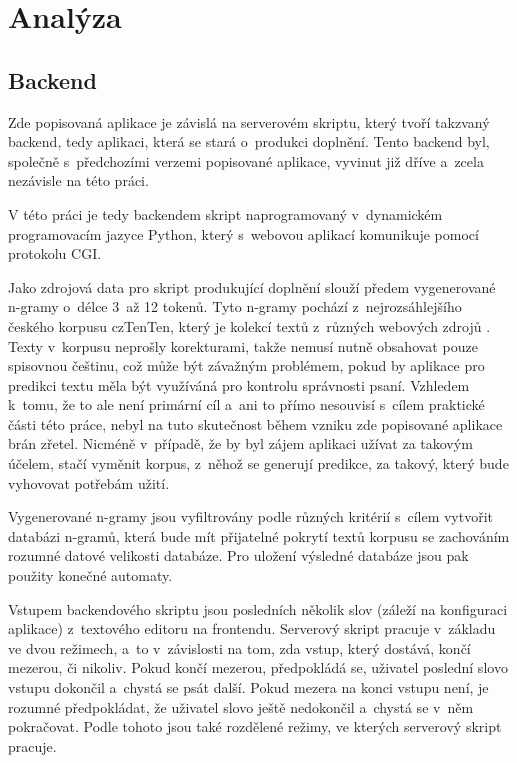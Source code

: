 \documentclass[a4paper,11pt,openany]{book} %
\begin{document}
\chapter{Analýza}

\section{Backend}

Zde popisovaná aplikace je závislá na serverovém skriptu, který tvoří takzvaný backend, tedy aplikaci, která se stará o~produkci doplnění. Tento backend byl, společně s~předchozími verzemi popisované aplikace, vyvinut již dříve a~zcela nezávisle na této práci. \parencite{neverilovaulipova2014}

V této práci je tedy backendem skript naprogramovaný v~dynamickém programovacím jazyce Python, který s~webovou aplikací komunikuje pomocí protokolu CGI. 

Jako zdrojová data pro skript produkující doplnění slouží předem vygenerované n-gramy o~délce 3~až 12 tokenů. Tyto n-gramy pochází z~nejrozsáhlejšího českého korpusu czTenTen, který je kolekcí textů z~různých webových zdrojů \parencite{czTenTen12_info}. Texty v~korpusu neprošly korekturami, takže nemusí nutně obsahovat pouze spisovnou češtinu, což může být závažným problémem, pokud by aplikace pro predikci textu měla být využíváná pro kontrolu správnosti psaní. Vzhledem k~tomu, že to ale není primární cíl a~ani to přímo nesouvisí s~cílem praktické části této práce, nebyl na tuto skutečnost během vzniku zde popisované aplikace brán zřetel. Nicméně v~případě, že by byl zájem aplikaci užívat za takovým účelem, stačí vyměnit korpus, z~něhož se generují predikce, za takový, který bude vyhovovat potřebám užití.


Vygenerované n-gramy jsou vyfiltrovány podle různých kritérií s~cílem vytvořit databázi n-gramů, která bude mít přijatelné pokrytí textů korpusu se zachováním rozumné datové velikosti databáze. Pro uložení výsledné databáze jsou pak použity konečné automaty. \parencite[13]{neverilovaulipova2014}



Vstupem backendového skriptu jsou posledních několik slov (záleží na konfiguraci aplikace) z~textového editoru na frontendu. Serverový skript pracuje v~základu ve dvou režimech, a~to v~závislosti na tom, zda vstup, který dostává, končí mezerou, či nikoliv. Pokud končí mezerou, předpokládá se, uživatel poslední slovo vstupu dokončil a~chystá se psát další. Pokud mezera na konci vstupu není, je rozumné předpokládat, že uživatel slovo ještě nedokončil a~chystá se v~něm pokračovat. Podle tohoto jsou také rozdělené režimy, ve kterých serverový skript pracuje. 
\end{document}
